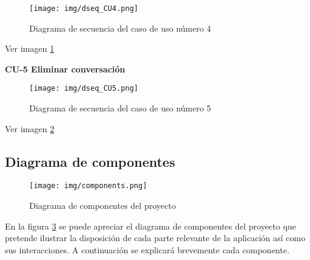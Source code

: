 \begin{figure}[h]
    \centering
    \texttt{[image: img/dseq\_CU4.png]}
    \caption{Diagrama de secuencia del caso de uso número 4}
    \label{fig:dseq4}
\end{figure}

Ver imagen \ref{fig:dseq4}

\textbf{CU-5 Eliminar conversación}

\begin{figure}[h]
    \centering
    \texttt{[image: img/dseq\_CU5.png]}
    \caption{Diagrama de secuencia del caso de uso número 5}
    \label{fig:dseq5}
\end{figure}

Ver imagen \ref{fig:dseq5}

\subsection{Diagrama de componentes}

\begin{figure}[h]
    \centering
    \texttt{[image: img/components.png]}
    \caption{Diagrama de componentes del proyecto}
    \label{fig:comps}
\end{figure}

En la figura \ref{fig:comps} se puede apreciar el diagrama de componentes del proyecto que pretende ilustrar la disposición de cada parte relevante de la aplicación así como sus interacciones. A continuación se explicará brevemente cada componente.

